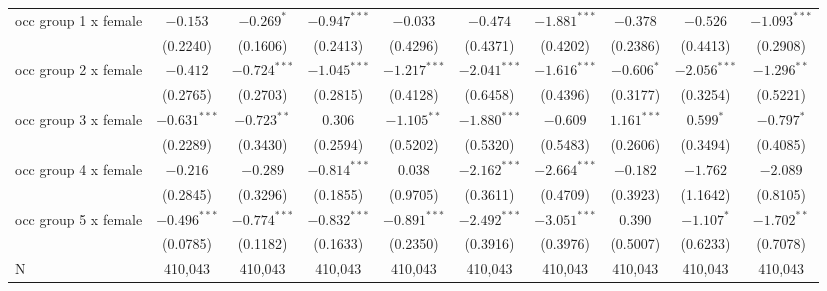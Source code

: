 \begin{tabular}{l|ccc|ccc|ccc|}
\midrule
occ group 1 x female &        $-0.153$ &      $-0.269^*$ &  $-0.947^{***}$ &        $-0.033$ &        $-0.474$ &  $-1.881^{***}$ &        $-0.378$ &        $-0.526$ &  $-1.093^{***}$ \\
                     &        (0.2240) &        (0.1606) &        (0.2413) &        (0.4296) &        (0.4371) &        (0.4202) &        (0.2386) &        (0.4413) &        (0.2908) \\
occ group 2 x female &        $-0.412$ &  $-0.724^{***}$ &  $-1.045^{***}$ &  $-1.217^{***}$ &  $-2.041^{***}$ &  $-1.616^{***}$ &      $-0.606^*$ &  $-2.056^{***}$ &   $-1.296^{**}$ \\
                     &        (0.2765) &        (0.2703) &        (0.2815) &        (0.4128) &        (0.6458) &        (0.4396) &        (0.3177) &        (0.3254) &        (0.5221) \\
occ group 3 x female &  $-0.631^{***}$ &   $-0.723^{**}$ &         $0.306$ &   $-1.105^{**}$ &  $-1.880^{***}$ &        $-0.609$ &   $1.161^{***}$ &       $0.599^*$ &      $-0.797^*$ \\
                     &        (0.2289) &        (0.3430) &        (0.2594) &        (0.5202) &        (0.5320) &        (0.5483) &        (0.2606) &        (0.3494) &        (0.4085) \\
occ group 4 x female &        $-0.216$ &        $-0.289$ &  $-0.814^{***}$ &         $0.038$ &  $-2.162^{***}$ &  $-2.664^{***}$ &        $-0.182$ &        $-1.762$ &        $-2.089$ \\
                     &        (0.2845) &        (0.3296) &        (0.1855) &        (0.9705) &        (0.3611) &        (0.4709) &        (0.3923) &        (1.1642) &        (0.8105) \\
occ group 5 x female &  $-0.496^{***}$ &  $-0.774^{***}$ &  $-0.832^{***}$ &  $-0.891^{***}$ &  $-2.492^{***}$ &  $-3.051^{***}$ &         $0.390$ &      $-1.107^*$ &   $-1.702^{**}$ \\
                     &        (0.0785) &        (0.1182) &        (0.1633) &        (0.2350) &        (0.3916) &        (0.3976) &        (0.5007) &        (0.6233) &        (0.7078) \\
\midrule
N                    &         410,043 &         410,043 &         410,043 &         410,043 &         410,043 &         410,043 &         410,043 &         410,043 &         410,043 \\
\bottomrule
\end{tabular}

